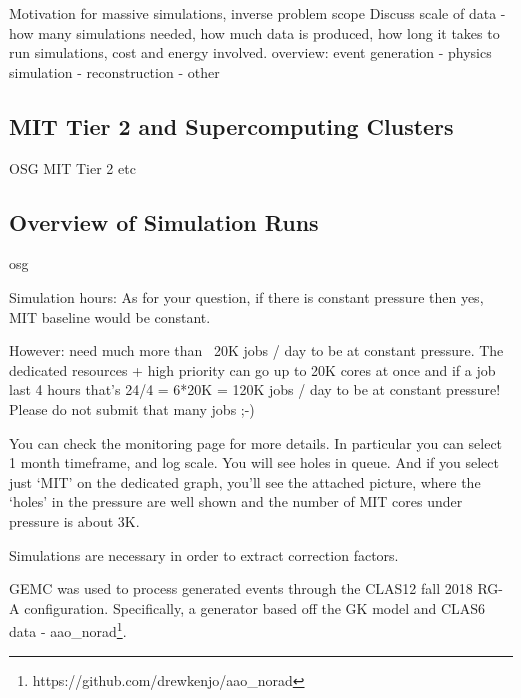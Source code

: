 Motivation for massive simulations, inverse problem scope
    Discuss scale of data - how many simulations needed, how much data is produced, how long it takes to run simulations, cost and energy involved.
    overview: event generation - physics simulation - reconstruction - other
    \subsection{MIT Tier 2 and Supercomputing Clusters}
        OSG MIT Tier 2 etc
    \subsection{Overview of Simulation Runs}

osg \parencite{OSG2006OSG} \parencite{Sfiligoi2009TheGlideinWMS} \parencite{Pordes2007TheGrid}


    Simulation hours: 
    As for your question, if there is constant pressure then yes, MIT baseline would be constant.

However: need much more than ~20K jobs / day to be at constant pressure. The dedicated resources + high priority can go up to 20K cores at once and if a job last 4 hours that’s 24/4 = 6*20K = 120K jobs / day to be at constant pressure! Please do not submit that many jobs ;-)

You can check the monitoring page for more details. In particular you can select 1 month timeframe, and log scale. You will see holes in queue.
And if you select just ‘MIT’ on the dedicated graph, you’ll see the attached picture, where the ‘holes’ in the pressure are well shown and the number of MIT cores under pressure is about 3K.

 Simulations are necessary in order to extract correction factors.
    
    GEMC was used to process generated events through the CLAS12 fall 2018 RG-A configuration. Specifically, a generator based off the GK model and CLAS6 data - aao\_norad\footnote{https://github.com/drewkenjo/aao\_norad}. 
